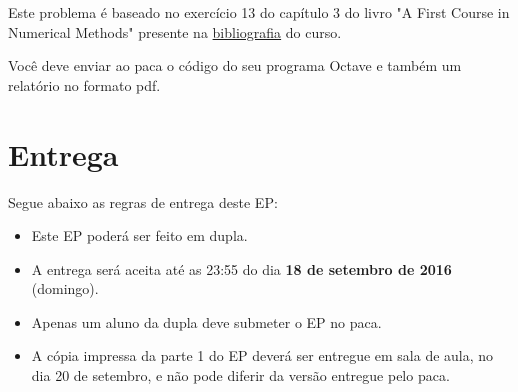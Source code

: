 \documentclass[12pt]{article}
\begin{document}
Este problema é baseado no exercício 13 do capítulo 3 do livro
"A First Course in Numerical Methods" presente na 
\href{http://ime.usp.br/~egbirgin/mac210/biblio.html}{bibliografia} do
curso.

Você deve enviar ao paca o código do seu programa Octave e também um 
relatório no formato pdf.

\section{Entrega}
Segue abaixo as regras de entrega deste EP:
\begin{itemize}
    \item{Este EP poderá ser feito em dupla.}
    \item{A entrega será aceita até as 23:55 do dia \textbf{18 de
            setembro de 2016} (domingo).}
    \item{Apenas um aluno da dupla deve submeter o EP no paca.} 
    \item{A cópia impressa da parte 1 do EP deverá ser entregue em sala
            de aula, no dia 20 de setembro, e não pode diferir da 
        versão entregue pelo paca.}
\end{itemize}
\end{document}
